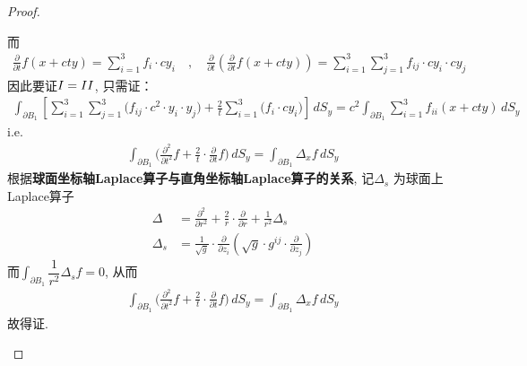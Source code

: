 \begin{thm}
\begin{proof}
\begin{enumerate}
\begin{enumerate}
					而
					\begin{align*}
						\frac{\partial}{\partial t} f(x + cty) 
						= \sum_{i = 1}^3 f_i \cdot cy_i 
						\hspace{1em} , \hspace{1em} 
						\frac{\partial}{\partial t} \left( \frac{\partial}{\partial t} f(x + cty) \right) 
						= \sum_{i = 1}^3 \sum_{j = 1}^3 f_{ij} \cdot cy_i \cdot cy_j
					\end{align*}
					因此要证$\Rmnum{1} = \Rmnum{2}$, 只需证：
					\begin{align*}
						\int_{\partial B_1} 
						\left[ 
						\sum_{i = 1}^3 \sum_{j = 1}^3 \Big( f_{ij} \cdot c^2 \cdot y_i \cdot y_j \Big) 
						+ \frac{2}{t} \sum_{i = 1}^3 \Big( f_i \cdot cy_i \Big) 
						\right] \, dS_y 
						= c^2 \int_{\partial B_1} \sum_{i = 1}^3 f_{ii}(x + cty) \, dS_y
					\end{align*}
					i.e. 
					\begin{align*}
						\int_{\partial B_1} \Big( \frac{\partial^2}{\partial t^2} f + \frac{2}{t} \cdot \frac{\partial}{\partial t} f \Big) \, dS_y 
						= \int_{\partial B_1} \Delta_x f \, dS_y
					\end{align*}
					根据\textbf{球面坐标轴Laplace算子与直角坐标轴Laplace算子的关系}, 记$\Delta_s$ 为球面上Laplace算子 
					\begin{align*}
						\Delta 
						&= \frac{\partial^2}{\partial r^2} + \frac{2}{r} \cdot \frac{\partial}{\partial r} + \frac{1}{r^2} \Delta_s \\
						\Delta_s 
						&= \frac{1}{\sqrt{g}} \cdot \frac{\partial}{\partial z_i} \left( \sqrt{g} \cdot g^{ij} \cdot \frac{\partial}{\partial z_j} \right)
					\end{align*}
					而$\int_{\partial B_1} \dfrac{1}{r^2} \Delta_s f = 0$, 从而
					\begin{align*}
						\int_{\partial B_1} \Big( \frac{\partial^2}{\partial t^2} f + \frac{2}{t} \cdot \frac{\partial}{\partial t} f \Big) \, dS_y 
						= \int_{\partial B_1} \Delta_x f \, dS_y
					\end{align*}
					故得证. 
				\end{enumerate}
			\end{enumerate}
		\end{proof}
	\end{thm}















	\ifx\allfiles\undefined

\fi